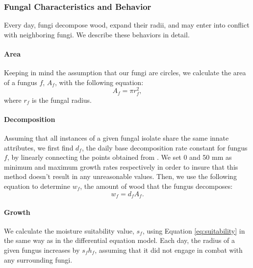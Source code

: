 \documentclass[12pt]{article}
\begin{document}
\subsubsection*{Fungal Characteristics and Behavior}
Every day, fungi decompose wood, expand their radii, and may enter into conflict with neighboring fungi. We describe these behaviors in detail.

\paragraph{Area}
Keeping in mind the assumption that our fungi are circles, we calculate the area of a fungus $f$, $A_f$, with the following equation:
\[A_f = \pi r_f^2, \]
where $r_f$ is the fungal radius.

\paragraph{Decomposition}
Assuming that all instances of a given fungal isolate share the same innate attributes, we first find $d_f$, the daily base decomposition rate constant for fungus $f$, by linearly connecting the points obtained from \cite{trait-based}. We set 0 and 50 mm as minimum and maximum growth rates respectively in order to insure that this method doesn't result in any unreasonable values. Then, we use the following equation to determine $w_f$, the amount of wood that the fungus decomposes:
\[w_f = d_f A_f.\]


\paragraph{Growth}
We calculate the moisture suitability value, $s_f$, using Equation \eqref{eq:suitability} in the same way as in the differential equation model. 
Each day, the radius of a given fungus increases by $s_fh_f$, assuming that it did not engage in combat with any surrounding fungi.
\end{document}
